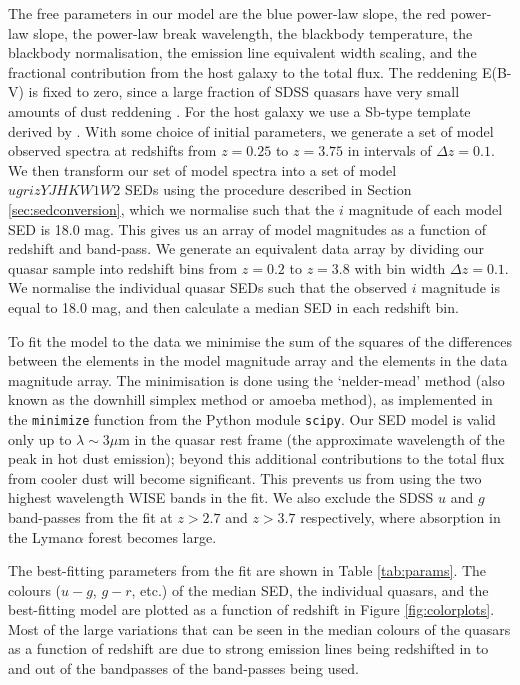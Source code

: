 The free parameters in our model are the blue power-law slope, the red power-law slope, the power-law break wavelength, the blackbody temperature, the blackbody normalisation, the emission line equivalent width scaling, and the fractional contribution from the host galaxy to the total flux. The reddening E(B-V) is fixed to zero, since a large fraction of SDSS quasars have very small amounts of dust reddening \citep{richards03}. For the host galaxy we use a Sb-type template derived by \citet{mannucci01}. With some choice of initial parameters, we generate a set of model observed spectra at redshifts from $z=0.25$ to $z=3.75$ in intervals of $\Delta z = 0.1$. We then transform our set of model spectra into a set of model $ugrizYJHKW1W2$ SEDs using the procedure described in Section \ref{sec:sedconversion}, which we normalise such that the $i$ magnitude of each model SED is 18.0 mag. This gives us an array of model magnitudes as a function of redshift and band-pass. We generate an equivalent data array by dividing our quasar sample into redshift bins from $z=0.2$ to $z=3.8$ with bin width $\Delta z = 0.1$. We normalise the individual quasar SEDs such that the observed $i$ magnitude is equal to 18.0 mag, and then calculate a median SED in each redshift bin. 

To fit the model to the data we minimise the sum of the squares of the differences between the elements in the model magnitude array and the elements in the data magnitude array. The minimisation is done using the `nelder-mead' method (also known as the downhill simplex method or amoeba method), as implemented in the {\tt minimize} function from the Python module {\tt scipy}. Our SED model is valid only up to $\lambda \sim 3\mu$m in the quasar rest frame (the approximate wavelength of the peak in hot dust emission); beyond this additional contributions to the total flux from cooler dust will become significant. This prevents us from using the two highest wavelength WISE bands in the fit. We also exclude the SDSS $u$ and $g$ band-passes from the fit at $z > 2.7$ and $z > 3.7$ respectively, where absorption in the Lyman$\alpha$ forest becomes large. 

The best-fitting parameters from the fit are shown in Table \ref{tab:params}. The colours ($u - g$, $g - r$, etc.) of the median SED, the individual quasars, and the best-fitting model are plotted as a function of redshift in Figure \ref{fig:colorplots}.  Most of the large variations that can be seen in the median colours of the quasars as a function of redshift are due to strong emission lines being redshifted in to and out of the bandpasses of the band-passes being used. 

